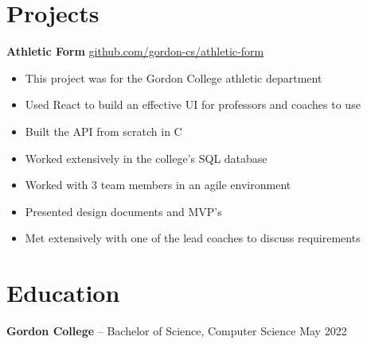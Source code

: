 \documentclass[11pt]{article}       %
\newcommand{\CS}{C\nolinebreak\hspace{-.05em}\raisebox{.6ex}{\scriptsize\bf \#}}
\begin{document}

\vspace{-18.5pt}

\section*{Projects}
\textbf{Athletic Form} \hfill \href{https://github.com/gordon-cs/athletic-form}{github.com/gordon-cs/athletic-form} \\
\vspace{-9pt}
\begin{itemize}
  \item{This project was for the Gordon College athletic department}
  \item{Used React to build an effective UI for professors and coaches to use}
  \item{Built the API from scratch in \CS}
  \item{Worked extensively in the college's SQL database}
  \item{Worked with 3 team members in an agile environment}
  \item{Presented design documents and MVP's}
  \item{Met extensively with one of the lead coaches to discuss requirements}
\end{itemize}


\vspace{-18.5pt}

\section*{Education}
\textbf{Gordon College} -- Bachelor of Science, Computer Science \hfill May 2022
\end{document}
